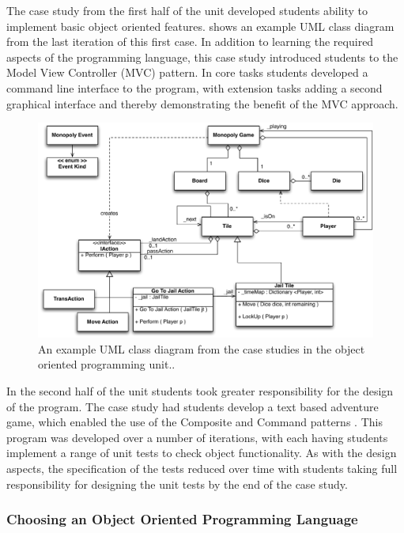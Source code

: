 The case study from the first half of the unit developed students ability to implement basic object oriented features.  shows an example UML class diagram from the last iteration of this first case. In addition to learning the required aspects of the programming language, this case study introduced students to the Model View Controller (MVC) pattern. In core tasks students developed a command line interface to the program, with extension tasks adding a second graphical interface and thereby demonstrating the benefit of the MVC approach.

\begin{figure}[htbp]
	\centering
	\includegraphics[width=\textwidth]{Monopoly}
	\caption{An example UML class diagram from the case studies in the object oriented programming unit..}
	\label{fig:monopoly}
\end{figure}

In the second half of the unit students took greater responsibility for the design of the program. The case study had students develop a text based adventure game, which enabled the use of the Composite and Command patterns \cite{Gamma:2001}. This program was developed over a number of iterations, with each having students implement a range of unit tests to check object functionality. As with the design aspects, the specification of the tests reduced over time with students taking full responsibility for designing the unit tests by the end of the case study.

\subsubsection{Choosing an Object Oriented Programming Language} %
\label{ssub:choosing_an_object_oriented_programming_language}

